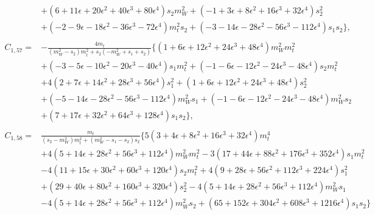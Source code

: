 \documentclass[twocolumn,aps,showpacs,nofootinbib,superscriptaddress,prd]{revtex4-2}
\begin{document}
\begin{widetext}
\begin{align}
\nonumber\\&
+\left(6 +11 \epsilon +20 \epsilon^2 +40 \epsilon^3 +80 \epsilon^4\right)s_2m_W^2+\left(-1 +3 \epsilon +8 \epsilon^2 +16 \epsilon^3 +32 \epsilon^4\right)s_2^2
\nonumber\\&
+\left(-2 -9 \epsilon -18 \epsilon^2 -36 \epsilon^3 -72 \epsilon^4\right)m_t^2s_2+\left(-3 -14 \epsilon -28 \epsilon^2 -56 \epsilon^3 -112 \epsilon^4\right)s_1s_2\}
,\nonumber\\
\nonumber\\
C_{1,57}=&-\frac{4m_t}{\left(m_W^2-s_2\right)m_t^2+s_2\left(-m_W^2+s_1+s_2\right)}\{\left(1 +6 \epsilon +12 \epsilon^2 +24 \epsilon^3 +48 \epsilon^4\right)m_W^2m_t^2
\nonumber\\&
+\left(-3 -5 \epsilon -10 \epsilon^2 -20 \epsilon^3 -40 \epsilon^4\right)s_1m_t^2+\left(-1 -6 \epsilon -12 \epsilon^2 -24 \epsilon^3 -48 \epsilon^4\right)s_2m_t^2
\nonumber\\&
+4\left(2 +7 \epsilon +14 \epsilon^2 +28 \epsilon^3 +56 \epsilon^4\right)s_1^2+\left(1 +6 \epsilon +12 \epsilon^2 +24 \epsilon^3 +48 \epsilon^4\right)s_2^2
\nonumber\\&
+\left(-5 -14 \epsilon -28 \epsilon^2 -56 \epsilon^3 -112 \epsilon^4\right)m_W^2s_1+\left(-1 -6 \epsilon -12 \epsilon^2 -24 \epsilon^3 -48 \epsilon^4\right)m_W^2s_2
\nonumber\\&
+\left(7 +17 \epsilon +32 \epsilon^2 +64 \epsilon^3 +128 \epsilon^4\right)s_1s_2\}
,\nonumber\\
\nonumber\\
C_{1,58}=&\frac{m_t}{\left(s_2-m_W^2\right)m_t^2+\left(m_W^2-s_1-s_2\right)s_2}\{5\left(3 +4 \epsilon +8 \epsilon^2 +16 \epsilon^3 +32 \epsilon^4\right)m_t^4
\nonumber\\&
+4\left(5 +14 \epsilon +28 \epsilon^2 +56 \epsilon^3 +112 \epsilon^4\right)m_W^2m_t^2-3\left(17 +44 \epsilon +88 \epsilon^2 +176 \epsilon^3 +352 \epsilon^4\right)s_1m_t^2
\nonumber\\&
-4\left(11 +15 \epsilon +30 \epsilon^2 +60 \epsilon^3 +120 \epsilon^4\right)s_2m_t^2+4\left(9 +28 \epsilon +56 \epsilon^2 +112 \epsilon^3 +224 \epsilon^4\right)s_1^2
\nonumber\\&
+\left(29 +40 \epsilon +80 \epsilon^2 +160 \epsilon^3 +320 \epsilon^4\right)s_2^2-4\left(5 +14 \epsilon +28 \epsilon^2 +56 \epsilon^3 +112 \epsilon^4\right)m_W^2s_1
\nonumber\\&
-4\left(5 +14 \epsilon +28 \epsilon^2 +56 \epsilon^3 +112 \epsilon^4\right)m_W^2s_2+\left(65 +152 \epsilon +304 \epsilon^2 +608 \epsilon^3 +1216 \epsilon^4\right)s_1s_2\}

\end{align}
\end{widetext}
\end{document}
